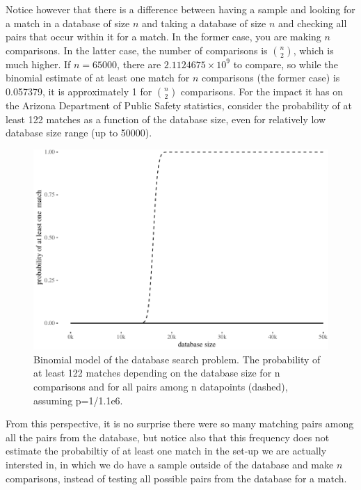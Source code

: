 \documentclass[10pt,dvipsnames,enabledeprecatedfontcommands]{scrartcl}
\begin{document}
Notice however that there is a difference between having a sample and
looking for a match in a database of size \(n\) and taking a database of
size \(n\) and checking all pairs that occur within it for a match. In
the former case, you are making \(n\) comparisons. In the latter case,
the number of comparisons is \({n \choose 2}\), which is much higher. If
\(n=65000\), there are \ensuremath{2.1124675\times 10^{9}} to compare,
so while the binomial estimate of at least one match for \(n\)
comparisons (the former case) is 0.057379, it is approximately 1 for
\({n \choose 2}\) comparisons. For the impact it has on the Arizona
Department of Public Safety statistics, consider the probability of at
least 122 matches as a function of the database size, even for
relatively low database size range (up to 50000).

\begin{figure}

{\centering \includegraphics[width=1\linewidth]{lr-chapter_files/figure-latex/unnamed-chunk-5-1} 

}

\caption{Binomial model of the database search problem. The probability of at least 122 matches depending on the database size for n comparisons and for all pairs among n datapoints (dashed), assuming p=1/1.1e6.}\label{fig:unnamed-chunk-5}
\end{figure}

From this perspective, it is no surprise there were so many matching
pairs among all the pairs from the database, but notice also that this
frequency does not estimate the probabiltiy of at least one match in the
set-up we are actually intersted in, in which we do have a sample
outside of the database and make \(n\) comparisons, instead of testing
all possible pairs from the database for a match.
\end{document}
